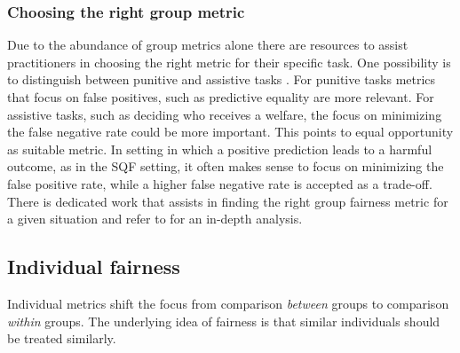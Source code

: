 \subsubsection*{Choosing the right group metric}

Due to the abundance of group metrics alone there are resources to assist practitioners in choosing the right metric for their specific task. One possibility is to distinguish between punitive and assistive tasks \cite{lane}. For punitive tasks metrics that focus on false positives, such as predictive equality are more relevant. For assistive tasks, such as deciding who receives a welfare, the focus on minimizing the false negative rate could be more important. This points to equal opportunity as suitable metric.
In setting in which a positive prediction leads to a harmful outcome, as in the SQF setting, it often makes sense to focus on minimizing the false positive rate, while a higher false negative rate is accepted as a trade-off.
There is dedicated work that assists in finding the right group fairness metric for a given situation and refer to \cite{makhlouf2021} for an in-depth analysis.

\subsection{Individual fairness}
Individual metrics shift the focus from comparison \textit{between} groups to comparison \textit{within} groups. The underlying idea of fairness is that similar individuals should be treated similarly.

